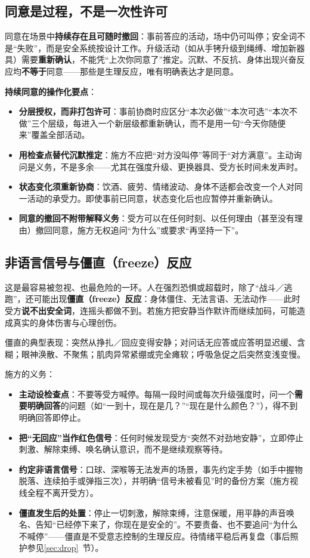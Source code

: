 \documentclass[12pt,UTF8]{ctexbook}
\begin{document}
\subsection{同意是过程，不是一次性许可}

同意在场景中\textbf{持续存在且可随时撤回}：事前答应的活动，场中仍可叫停；安全词不是“失败”，而是安全系统按设计工作。升级活动（如从手铐升级到绳缚、增加新器具）需要\textbf{重新确认}，不能凭“上次你同意了”推定。沉默、不反抗、身体出现兴奋反应均\textbf{不等于}同意——那些是生理反应，唯有明确表达才是同意。

\textbf{持续同意的操作化要点}：

\begin{itemize}
\item \textbf{分层授权，而非打包许可}：事前协商时应区分“本次必做”“本次可选”“本次不做”三个层级，每进入一个新层级都重新确认，而不是用一句“今天你随便来”覆盖全部活动。
\item \textbf{用检查点替代沉默推定}：施方不应把“对方没叫停”等同于“对方满意”。主动询问是义务，不是多余——尤其在强度升级、更换器具、受方长时间未发声时。
\item \textbf{状态变化须重新协商}：饮酒、疲劳、情绪波动、身体不适都会改变一个人对同一活动的承受力。即使事前已同意，状态变化后也应暂停并重新确认。
\item \textbf{同意的撤回不附带解释义务}：受方可以在任何时刻、以任何理由（甚至没有理由）撤回同意，施方无权追问“为什么”或要求“再坚持一下”。
\end{itemize}

\subsection{非语言信号与僵直（freeze）反应}\label{sec:freeze}

这是最容易被忽视、也最危险的一环。人在强烈恐惧或超载时，除了“战斗／逃跑”，还可能出现\textbf{僵直（freeze）反应}：身体僵住、无法言语、无法动作——此时受方\textbf{说不出安全词}，连摇头都做不到。若施方把安静当作默许而继续加码，可能造成真实的身体伤害与心理创伤。

僵直的典型表现：突然从挣扎／回应变得安静；对问话无应答或应答明显迟缓、含糊；眼神涣散、不聚焦；肌肉异常紧绷或完全瘫软；呼吸急促之后突然变浅变慢。

施方的义务：

\begin{itemize}
\item \textbf{主动设检查点}：不要等受方喊停。每隔一段时间或每次升级强度时，问一个\textbf{需要明确回答}的问题（如“一到十，现在是几？”“现在是什么颜色？”），得不到明确回答即停止。
\item \textbf{把“无回应”当作红色信号}：任何时候发现受方“突然不对劲地安静”，立即停止刺激、解除束缚、唤名确认意识，而不是继续观察等待。
\item \textbf{约定非语言信号}：口球、深喉等无法发声的场景，事先约定手势（如手中握物脱落、连续拍手或弹指三次），并明确“信号未被看见”时的备份方案（施方视线全程不离开受方）。
\item \textbf{僵直发生后的处置}：停止一切刺激，解除束缚，注意保暖，用平静的声音唤名、告知“已经停下来了，你现在是安全的”。不要责备、也不要追问“为什么不喊停”——僵直是不受意志控制的生理反应。待情绪平稳后再复盘（事后照护参见\ref{sec:drop}~节）。
\end{itemize}
\end{document}
